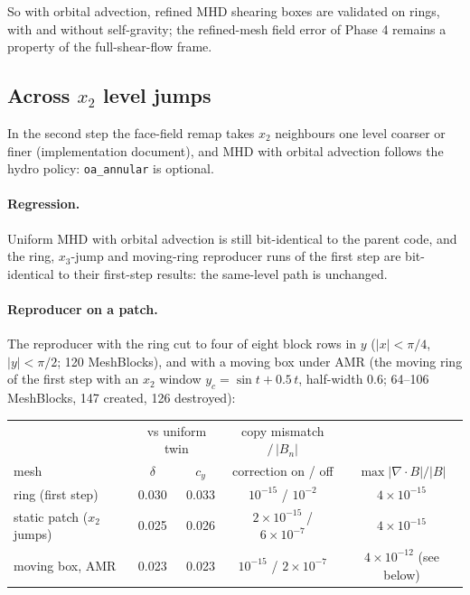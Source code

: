 \documentclass[11pt]{article}
\newcommand{\code}[1]{\texttt{#1}}
\begin{document}
So with orbital advection, refined MHD shearing boxes are validated on rings, with and
without self-gravity; the refined-mesh field error of Phase 4 remains a property of the
full-shear-flow frame.

\subsection{Across \texorpdfstring{$x_2$}{x2} level jumps}
\label{sec:mhdB}
In the second step the face-field remap takes $x_2$ neighbours one level coarser or finer
(implementation document), and MHD with orbital advection follows the hydro policy:
\code{oa\_annular} is optional.

\paragraph{Regression.} Uniform MHD with orbital advection is still bit-identical to the
parent code, and the ring, $x_3$-jump and moving-ring reproducer runs of the first step are
bit-identical to their first-step results: the same-level path is unchanged.

\paragraph{Reproducer on a patch.} The reproducer with the ring cut to four of eight block
rows in $y$ ($|x| < \pi/4$, $|y| < \pi/2$; 120 MeshBlocks), and with a moving box under AMR
(the moving ring of the first step with an $x_2$ window $y_c = \sin t + 0.5\,t$, half-width
0.6; 64--106 MeshBlocks, 147 created, 126 destroyed):

\begin{center}
\small
\begin{tabular}{@{}lcccc@{}}
\toprule
& \multicolumn{2}{c}{vs uniform twin} & copy mismatch $/\,|B_n|$ & \\
mesh & $\delta$ & $c_y$ & correction on / off & $\max|\nabla\!\cdot\!B|/|B|$ \\
\midrule
ring (first step)            & 0.030 & 0.033 & $10^{-15}$ / $10^{-2}$ & $4\times10^{-15}$ \\
static patch ($x_2$ jumps)   & 0.025 & 0.026 & $2\times10^{-15}$ / $6\times10^{-7}$ & $4\times10^{-15}$ \\
moving box, AMR              & 0.023 & 0.023 & $10^{-15}$ / $2\times10^{-7}$ & $4\times10^{-12}$ (see below) \\
\bottomrule
\end{tabular}
\end{center}
\end{document}
